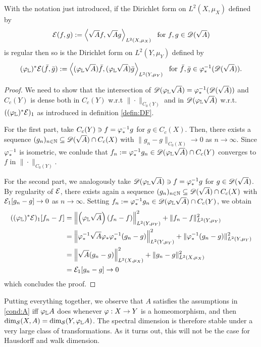 \begin{lem}
  With the notation just introduced, if the Dirichlet form on $L^2(X,\mu_X)$ defined by 
  \[
    \cE(f,g):=\left<\sqrt{A}f,\sqrt{A}g\right>_{L^2(X,\mu_X)}\ \text{ for } f,g\in\scD(\sqrt{A})
  \]
 is regular then so is the Dirichlet form on $L^2(Y,\mu_Y)$ defined by 
 \[
   (\varphi_{\mathbb{L}})^*\mathcal{E}(\bar f,\bar g):=\left<(\varphi_{\mathbb{L}}\sqrt{A})\bar f,(\varphi_{\mathbb{L}}\sqrt{A})\bar g\right>_{L^2(Y,\mu_Y)}\ \text{ for } \bar f,\bar g\in\varphi_*^{-1}(\mathscr{D}(\sqrt{A})).
 \]
\end{lem}
\begin{proof}
  We need to show that the intersection of $\mathscr{D}(\varphi_{\mathbb{L}}\sqrt{A})=\varphi_*^{-1}(\mathscr{D}(\sqrt{A}))$ and $C_c(Y)$ is dense both in $C_c(Y)$ w.r.t $\|\cdot\|_{C_0(Y)}$ and in $\mathscr{D}(\varphi_{\mathbb{L}}\sqrt{A})$ w.r.t. $((\varphi_{\mathbb{L}})^*\mathcal{E})_1$ as introduced in definition \ref{defin:DF}.
  
  For the first part, take $C_c(Y)\ni f=\varphi_*^{-1} g$ for $g\in C_c(X)$. Then, there exists a sequence $(g_n)_{n\in\mathbb{N}}\subseteq \mathscr{D}(\sqrt{A})\cap C_c(X)$ with $\|g_n-g\|_{C_0(X)}\to 0$ as $n\to\infty$. Since $\varphi_*^{-1}$ is isometric, we conlude that $f_n:=\varphi_*^{-1}g_n\in \mathscr{D}(\varphi_{\mathbb{L}}\sqrt{A})\cap C_c(Y)$ converges to $f$ in 
  $\|\cdot\|_{C_0(Y)}$.
  
  For the second part, we analogously take $\mathscr{D}(\varphi_{\mathbb{L}}\sqrt{A})\ni f=\varphi_*^{-1} g$ for $g\in\mathscr{D}(\sqrt{A})$. By regularity of $\mathcal{E}$, there exists again a sequence $(g_n)_{n\in\mathbb{N}}\subseteq\mathscr{D}(\sqrt{A})\cap C_c(X)$ with $\mathcal{E}_1[g_n-g]\to 0$ as $n\to\infty$. Setting $f_n:=\varphi_*^{-1} g_n\in\mathscr{D}(\varphi_{\mathbb{L}}\sqrt{A})\cap C_c(Y)$, we obtain
  \begin{align*}
    ((\varphi_{\mathbb{L}})^*\mathcal{E})_1[f_n-f]
    &=\left\|\left(\varphi_{\mathbb{L}}\sqrt{A}\right)(f_n-f)\right\|_{L^2(Y,\mu_Y)}^2
        +\|f_n-f\|_{L^2(Y,\mu_Y)}^2\\
    &=\left\|\varphi_*^{-1}\sqrt{A}\varphi_*\varphi_*^{-1}(g_n-g)\right\|_{L^2(Y,\mu_Y)}^2
        +\|\varphi_*^{-1}(g_n-g)\|_{L^2(Y,\mu_Y)}^2\\
    &=\left\|\sqrt{A}(g_n-g)\right\|_{L^2(X,\mu_X)}^2+\|g_n-g\|_{L^2(X,\mu_X)}^2\\
    &=\mathcal{E}_1[g_n-g]\to 0
  \end{align*}
  which concludes the proof.
\end{proof}

Putting everything together, we observe that $A$ satisfies the assumptions in \ref{cond:A} iff $\varphi_{\mathbb{L}} A$ does whenever $\varphi:X\to Y$ is a homeomorphism, and then $\dim_{\mathcal{S}}(X,A)=\dim_{\mathcal{S}}(Y,\varphi_{\mathbb{L}} A)$. The spectral dimension is therefore stable under a very large class of transformations. As it turns out, this will not be the case for Hausdorff and walk dimension. 

